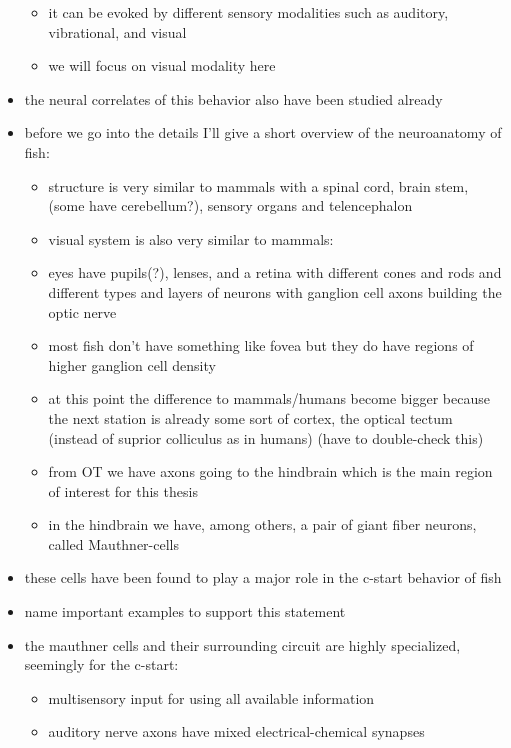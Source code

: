 \documentclass[a4paper,10pt,hidelinks]{scrreprt}
\begin{document}
	\begin{itemize}
		\begin{itemize}
		\item it can be evoked by different sensory modalities such as 
		auditory, 
		vibrational, and visual
		\item we will focus on visual modality here
		\end{itemize}
		\item the neural correlates of this behavior also have been studied 
		already
		\item before we go into the details I'll give a short overview of the 
		neuroanatomy of fish:
		\begin{itemize}
		\item structure is very similar to mammals with a spinal cord, brain 
		stem, 
		(some have cerebellum?), sensory organs and telencephalon
		\item visual system is also very similar to mammals:
		\item eyes have pupils(?), lenses, and a retina with different cones 
		and 
		rods and different types and layers of neurons with ganglion cell axons 
		building the optic nerve
		\item most fish don't have something like fovea but they do have 
		regions of 
		higher ganglion cell density \cite{Pita2015}
		\item at this point the difference to mammals/humans become bigger 
		because 
		the next station is already some sort of cortex, the optical tectum 
		(instead of suprior colliculus as in humans) (have to double-check this)
		\item from OT we have axons going to the hindbrain which is the main 
		region 
		of interest for this thesis
		\item in the hindbrain we have, among others, a pair of giant fiber 
		neurons, called Mauthner-cells
		\end{itemize}
		\item these cells have been found to play a major role in the c-start 
		behavior of fish
		\item name important examples to support this statement
		\item the mauthner cells and their surrounding circuit are highly 
		specialized, seemingly for the c-start:
		\begin{itemize}
		\item multisensory input for using all available information
		\item auditory nerve axons have mixed electrical-chemical synapses 

\end{itemize}
\end{itemize}
\end{document}
